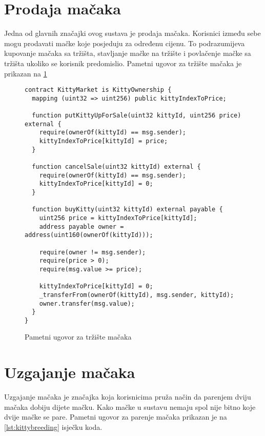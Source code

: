 \documentclass[times, utf8, tehnicka_dokumentacija]{fer}
\begin{document}
\section{Prodaja mačaka}
Jedna od glavnih značajki ovog sustava je prodaja mačaka. Korisnici između sebe mogu prodavati mačke koje posjeduju za
određenu cijenu. To podrazumijeva kupovanje mačaka sa tržišta, stavljanje mačke na tržište i povlačenje mačke sa tržišta
ukoliko se korisnik predomislio. Pametni ugovor za tržište mačaka je prikazan na \ref{lst:kittymarket}

\begin{figure}
\begin{lstlisting}
contract KittyMarket is KittyOwnership {
  mapping (uint32 => uint256) public kittyIndexToPrice;

  function putKittyUpForSale(uint32 kittyId, uint256 price) external {
    require(ownerOf(kittyId) == msg.sender);
    kittyIndexToPrice[kittyId] = price;
  }

  function cancelSale(uint32 kittyId) external {
    require(ownerOf(kittyId) == msg.sender);
    kittyIndexToPrice[kittyId] = 0;
  }

  function buyKitty(uint32 kittyId) external payable {
    uint256 price = kittyIndexToPrice[kittyId];
    address payable owner = address(uint160(ownerOf(kittyId)));

    require(owner != msg.sender);
    require(price > 0);
    require(msg.value >= price);

    kittyIndexToPrice[kittyId] = 0;
    _transferFrom(ownerOf(kittyId), msg.sender, kittyId);
    owner.transfer(msg.value);
  }
}
\end{lstlisting}
\caption{Pametni ugovor za tržište mačaka}
\label{lst:kittymarket}
\end{figure}

\section{Uzgajanje mačaka}
Uzgajanje mačaka je značajka koja korisnicima pruža način da parenjem dviju mačaka dobiju dijete mačku. Kako mačke u
sustavu nemaju spol nije bitno koje dvije mačke se pare. Pametni ugovor za parenje mačaka prikazan je na
\ref{lst:kittybreeding} isječku koda.
\end{document}
